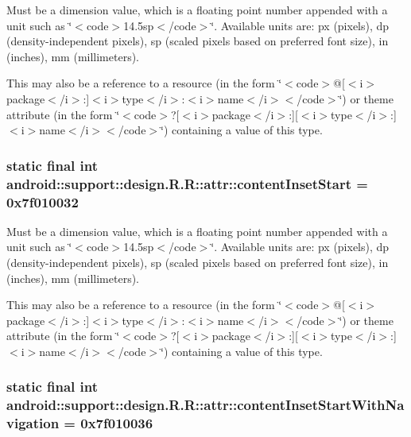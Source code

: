 Must be a dimension value, which is a floating point number appended with a unit such as \char`\"{}$<$code$>$14.5sp$<$/code$>$\char`\"{}. Available units are: px (pixels), dp (density-independent pixels), sp (scaled pixels based on preferred font size), in (inches), mm (millimeters). 

This may also be a reference to a resource (in the form \char`\"{}$<$code$>$@\mbox{[}$<$i$>$package$<$/i$>$:\mbox{]}$<$i$>$type$<$/i$>$:$<$i$>$name$<$/i$>$$<$/code$>$\char`\"{}) or theme attribute (in the form \char`\"{}$<$code$>$?\mbox{[}$<$i$>$package$<$/i$>$:\mbox{]}\mbox{[}$<$i$>$type$<$/i$>$:\mbox{]}$<$i$>$name$<$/i$>$$<$/code$>$\char`\"{}) containing a value of this type. \hypertarget{classandroid_1_1support_1_1design_1_1_r_1_1attr_73e679647c59419bfd6590261420c768}{
\subsubsection[{contentInsetStart}]{\setlength{\rightskip}{0pt plus 5cm}static final int android::support::design.R.R::attr::contentInsetStart = 0x7f010032}}
\label{classandroid_1_1support_1_1design_1_1_r_1_1attr_73e679647c59419bfd6590261420c768}


Must be a dimension value, which is a floating point number appended with a unit such as \char`\"{}$<$code$>$14.5sp$<$/code$>$\char`\"{}. Available units are: px (pixels), dp (density-independent pixels), sp (scaled pixels based on preferred font size), in (inches), mm (millimeters). 

This may also be a reference to a resource (in the form \char`\"{}$<$code$>$@\mbox{[}$<$i$>$package$<$/i$>$:\mbox{]}$<$i$>$type$<$/i$>$:$<$i$>$name$<$/i$>$$<$/code$>$\char`\"{}) or theme attribute (in the form \char`\"{}$<$code$>$?\mbox{[}$<$i$>$package$<$/i$>$:\mbox{]}\mbox{[}$<$i$>$type$<$/i$>$:\mbox{]}$<$i$>$name$<$/i$>$$<$/code$>$\char`\"{}) containing a value of this type. \hypertarget{classandroid_1_1support_1_1design_1_1_r_1_1attr_9e9f174894f86c4881d16cddf10fceab}{
\subsubsection[{contentInsetStartWithNavigation}]{\setlength{\rightskip}{0pt plus 5cm}static final int android::support::design.R.R::attr::contentInsetStartWithNavigation = 0x7f010036}}
\label{classandroid_1_1support_1_1design_1_1_r_1_1attr_9e9f174894f86c4881d16cddf10fceab}



